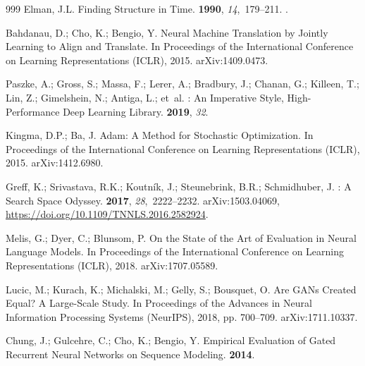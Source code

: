 \documentclass[mti,article,submit,moreauthors]{Definitions/mdpi}
\begin{document}
\begin{thebibliography}{999}
Elman, J.L.
\newblock Finding Structure in Time.
 {\bf 1990}, {\em 14},~179--211.
.

Bahdanau, D.; Cho, K.; Bengio, Y.
\newblock Neural Machine Translation by Jointly Learning to Align and
  Translate.
\newblock In Proceedings of the International Conference on Learning
  Representations (ICLR),  2015.
\newblock arXiv:1409.0473.

Paszke, A.; Gross, S.; Massa, F.; Lerer, A.; Bradbury, J.; Chanan, G.; Killeen,
  T.; Lin, Z.; Gimelshein, N.; Antiga, L.;  et~al.
: An Imperative Style, High-Performance Deep Learning
  Library.
  {\bf 2019}, {\em 32}.

Kingma, D.P.; Ba, J.
\newblock Adam: A Method for Stochastic Optimization.
\newblock In Proceedings of the International Conference on Learning
  Representations (ICLR),  2015.
\newblock arXiv:1412.6980.

Greff, K.; Srivastava, R.K.; Koutn{\'i}k, J.; Steunebrink, B.R.; Schmidhuber,
  J.
: A Search Space Odyssey.
 {\bf
  2017}, {\em 28},~2222--2232.
\newblock arXiv:1503.04069, {\url{https://doi.org/10.1109/TNNLS.2016.2582924}}.

Melis, G.; Dyer, C.; Blunsom, P.
\newblock On the State of the Art of Evaluation in Neural Language Models.
\newblock In Proceedings of the International Conference on Learning
  Representations (ICLR),  2018.
\newblock arXiv:1707.05589.

Lucic, M.; Kurach, K.; Michalski, M.; Gelly, S.; Bousquet, O.
\newblock Are {GAN}s Created Equal? A Large-Scale Study.
\newblock In Proceedings of the Advances in Neural Information Processing
  Systems (NeurIPS),  2018, pp. 700--709.
\newblock arXiv:1711.10337.

Chung, J.; Gulcehre, C.; Cho, K.; Bengio, Y.
\newblock Empirical Evaluation of Gated Recurrent Neural Networks on Sequence
  Modeling.
 {\bf 2014}.

\end{thebibliography}

\PublishersNote{}
\end{document}

